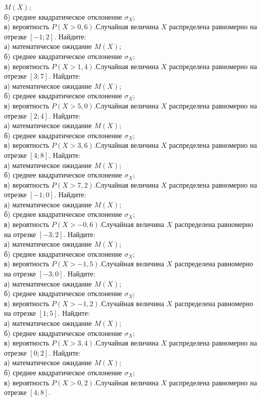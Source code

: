 $M(X)$; \\ \quad б) среднее квадратическое отклонение $\sigma_X$; \\ \quad в) вероятность $P(X>0{,}6)$.Случайная величина $X$ распределена равномерно на отрезке $[-1; 2]$. Найдите: \\ \quad а) математическое ожидание $M(X)$; \\ \quad б) среднее квадратическое отклонение $\sigma_X$; \\ \quad в) вероятность $P(X>1{,}4)$.Случайная величина $X$ распределена равномерно на отрезке $[3; 7]$. Найдите: \\ \quad а) математическое ожидание $M(X)$; \\ \quad б) среднее квадратическое отклонение $\sigma_X$; \\ \quad в) вероятность $P(X>5{,}0)$.Случайная величина $X$ распределена равномерно на отрезке $[2; 4]$. Найдите: \\ \quad а) математическое ожидание $M(X)$; \\ \quad б) среднее квадратическое отклонение $\sigma_X$; \\ \quad в) вероятность $P(X>3{,}6)$.Случайная величина $X$ распределена равномерно на отрезке $[4; 8]$. Найдите: \\ \quad а) математическое ожидание $M(X)$; \\ \quad б) среднее квадратическое отклонение $\sigma_X$; \\ \quad в) вероятность $P(X>7{,}2)$.Случайная величина $X$ распределена равномерно на отрезке $[-1; 0]$. Найдите: \\ \quad а) математическое ожидание $M(X)$; \\ \quad б) среднее квадратическое отклонение $\sigma_X$; \\ \quad в) вероятность $P(X>-0{,}6)$.Случайная величина $X$ распределена равномерно на отрезке $[-3; 2]$. Найдите: \\ \quad а) математическое ожидание $M(X)$; \\ \quad б) среднее квадратическое отклонение $\sigma_X$; \\ \quad в) вероятность $P(X>-1{,}5)$.Случайная величина $X$ распределена равномерно на отрезке $[-3; 0]$. Найдите: \\ \quad а) математическое ожидание $M(X)$; \\ \quad б) среднее квадратическое отклонение $\sigma_X$; \\ \quad в) вероятность $P(X>-1{,}2)$.Случайная величина $X$ распределена равномерно на отрезке $[1; 5]$. Найдите: \\ \quad а) математическое ожидание $M(X)$; \\ \quad б) среднее квадратическое отклонение $\sigma_X$; \\ \quad в) вероятность $P(X>3{,}4)$.Случайная величина $X$ распределена равномерно на отрезке $[0; 2]$. Найдите: \\ \quad а) математическое ожидание $M(X)$; \\ \quad б) среднее квадратическое отклонение $\sigma_X$; \\ \quad в) вероятность $P(X>0{,}2)$.Случайная величина $X$ распределена равномерно на отрезке $[4; 8]$. 